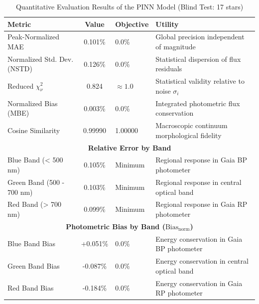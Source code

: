 
\begin{table}[htpb]
\centering
\caption{Quantitative Evaluation Results of the PINN Model (Blind Test: 17 stars)}
\label{tab:pinn_evaluation}
\begin{tabular}{lcll}
\hline
\textbf{Metric} & \textbf{Value} & \textbf{Objective} & \textbf{Utility} \\
\hline
Peak-Normalized MAE & 0.101\% & 0.0\% & Global precision independent of magnitude \\
Normalized Std. Dev. (NSTD) & 0.126\% & 0.0\% & Statistical dispersion of flux residuals \\
Reduced $\chi^2_\nu$ & 0.824 & $\approx 1.0$ & Statistical validity relative to noise $\sigma_i$ \\
Normalized Bias (MBE) & 0.003\% & 0.0\% & Integrated photometric flux conservation \\
Cosine Similarity & 0.99990 & 1.00000 & Macroscopic continuum morphological fidelity \\
\hline
\multicolumn{4}{c}{\textbf{Relative Error by Band}} \\
\hline
Blue Band (< 500 nm) & 0.105\% & Minimum & Regional response in Gaia BP photometer \\
Green Band (500 - 700 nm) & 0.103\% & Minimum & Regional response in central optical band \\
Red Band (> 700 nm) & 0.099\% & Minimum & Regional response in Gaia RP photometer \\
\hline
\multicolumn{4}{c}{\textbf{Photometric Bias by Band ($\text{Bias}_{\text{norm}}$)}} \\
\hline
Blue Band Bias & +0.051\% & 0.0\% & Energy conservation in Gaia BP photometer \\
Green Band Bias & -0.087\% & 0.0\% & Energy conservation in central optical band \\
Red Band Bias & -0.184\% & 0.0\% & Energy conservation in Gaia RP photometer \\
\hline
\end{tabular}
\end{table}
